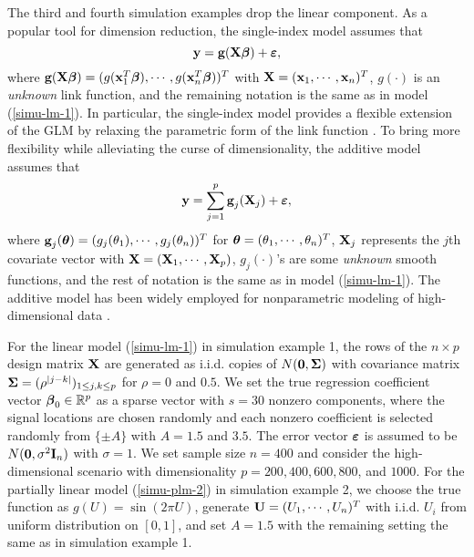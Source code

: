 \documentclass[11pt]{article}
\newcommand{\bg}{\mbox{\bf g}}
\newcommand{\bx}{\mbox{\bf x}}
\newcommand{\by}{\mbox{\bf y}}
\newcommand{\bI}{\mbox{\bf I}}
\newcommand{\bU}{\mbox{\bf U}}
\newcommand{\bX}{\mbox{\bf X}}
\newcommand{\bzero}{\mbox{\bf 0}}
\newcommand{\bveps}{\mbox{\boldmath $\varepsilon$}}
\newcommand{\bbeta}{\mbox{\boldmath $\beta$}}
\newcommand{\btheta}{\mbox{\boldmath $\theta$}}
\newcommand{\bSig}{\mbox{\boldmath $\Sigma$}}
\def\t{^T}
\begin{document}
The third and fourth simulation examples drop the linear component. As a popular tool for dimension reduction, the single-index model assumes that
\begin{equation} \label{simu-sim-3}
\by = {\bg}(\bX\bbeta) + \bveps,
\end{equation}
where ${\bg}(\bX\bbeta)=(g(\bx_1^T\bbeta),\cdots,g(\bx_n^T\bbeta))^T$ with $\bX = (\bx_1, \cdots, \bx_n)\t$, $g(\cdot)$ is an \textit{unknown} link function, and the remaining notation is the same as in model (\ref{simu-lm-1}). In particular, the single-index model provides a flexible extension of the GLM by relaxing the parametric form of the link function \cite{ichimura1993semiparametric, stoker1986consistent, hardle1989investigating, li2007nonparametric, horowitz2009semiparametric}. To bring more flexibility while alleviating the curse of dimensionality, the additive model assumes that
\begin{equation} \label{simu-gam-4}
\by =\sum_{j=1}^p \bg_j(\bX_j) + \bveps,
\end{equation}
where $\bg_j(\btheta) = (g_j(\theta_1), \cdots, g_j(\theta_n))^T$ for $\btheta = (\theta_1, \cdots, \theta_n)\t$, $\bX_j$ represents the $j$th covariate vector with $\bX = (\bX_1, \cdots, \bX_p)$, $g_j(\cdot)$'s are some \textit{unknown} smooth functions, and the rest of notation is the same as in model (\ref{simu-lm-1}). The additive model has been widely employed for nonparametric modeling of high-dimensional data \cite{Hastie1990,%
Ravikumar2009,Meier2009,%
Chouldechova2015}.

For the linear model (\ref{simu-lm-1}) in simulation example 1, the rows of the $n \times p$ design matrix $\bX$ are generated as i.i.d. copies of $N(\bzero, \bSig)$ with covariance matrix $\bSig = (\rho^{|j - k|})_{1 \leq j, k \leq p}$ for $\rho = 0$ and $0.5$. We set the true regression coefficient vector $\bbeta_0\in \mathbb{R}^p$ as a sparse vector with $s = 30$ nonzero components, where the signal locations are chosen randomly and each nonzero coefficient is selected randomly from $\{\pm A\}$ with $A=1.5$ and $3.5$. The error vector $\bveps$ is assumed to be $N(\bzero, \sigma^2 \bI_n)$ with $\sigma = 1$. We set sample size $n = 400$ and consider the high-dimensional scenario with dimensionality $p = 200, 400, 600, 800$, and $1000$. For the partially linear model (\ref{simu-plm-2}) in simulation example 2, we choose the true function as $g(U)=\sin(2\pi U)$, generate ${\bU} = (U_1, \cdots, U_n)^T$ with i.i.d. $U_i$ from uniform distribution on $[0, 1]$, and set $A = 1.5$ with the remaining setting the same as in simulation example 1.
\end{document}
